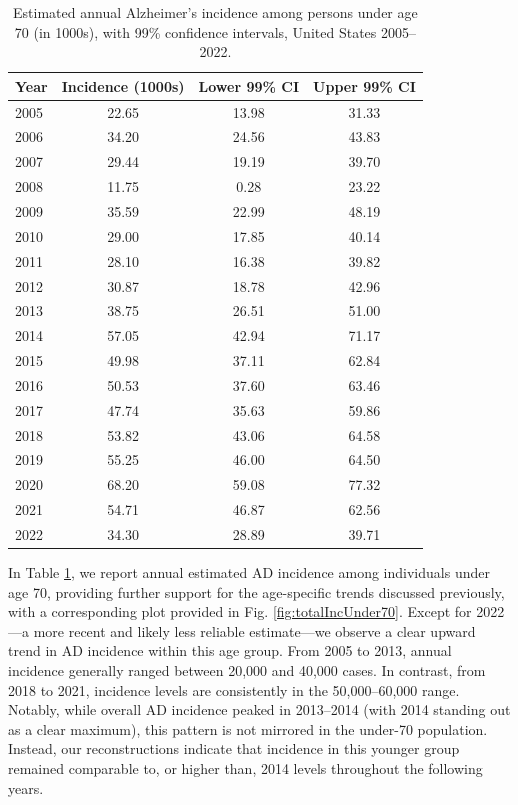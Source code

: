 \documentclass{article}
\begin{document}
\begin{table}[t]
\centering
\begin{tabular}{|l||c|c|c|}
\hline
Year & Incidence (1000s) & Lower 99\% CI & Upper 99\% CI \\ \hline \hline
2005 & 22.65 & 13.98 & 31.33 \\ \hline
2006 & 34.20 & 24.56 & 43.83 \\ \hline
2007 & 29.44 & 19.19 & 39.70 \\ \hline
2008 & 11.75 &  0.28 & 23.22 \\ \hline
2009 & 35.59 & 22.99 & 48.19 \\ \hline
2010 & 29.00 & 17.85 & 40.14 \\ \hline
2011 & 28.10 & 16.38 & 39.82 \\ \hline
2012 & 30.87 & 18.78 & 42.96 \\ \hline
2013 & 38.75 & 26.51 & 51.00 \\ \hline
2014 & 57.05 & 42.94 & 71.17 \\ \hline
2015 & 49.98 & 37.11 & 62.84 \\ \hline
2016 & 50.53 & 37.60 & 63.46 \\ \hline
2017 & 47.74 & 35.63 & 59.86 \\ \hline
2018 & 53.82 & 43.06 & 64.58 \\ \hline
2019 & 55.25 & 46.00 & 64.50 \\ \hline
2020 & 68.20 & 59.08 & 77.32 \\ \hline
2021 & 54.71 & 46.87 & 62.56 \\ \hline
2022 & 34.30 & 28.89 & 39.71 \\ \hline
\end{tabular}
\caption{Estimated annual Alzheimer’s incidence among persons under age 70 (in 1000s), with 99\% confidence intervals, United States 2005–2022.}
\label{tab:under70Incidence}
\end{table}


In Table \ref{tab:under70Incidence}, we report annual estimated AD incidence among individuals under age 70, providing further support for the age-specific trends discussed previously, with a corresponding plot provided in Fig. \ref{fig:totalIncUnder70}. Except for 2022—a more recent and likely less reliable estimate—we observe a clear upward trend in AD incidence within this age group. From 2005 to 2013, annual incidence generally ranged between 20,000 and 40,000 cases. In contrast, from 2018 to 2021, incidence levels are consistently in the 50,000–60,000 range. Notably, while overall AD incidence peaked in 2013–2014 (with 2014 standing out as a clear maximum), this pattern is not mirrored in the under-70 population. Instead, our reconstructions indicate that incidence in this younger group remained comparable to, or higher than, 2014 levels throughout the following years. 
\end{document}
